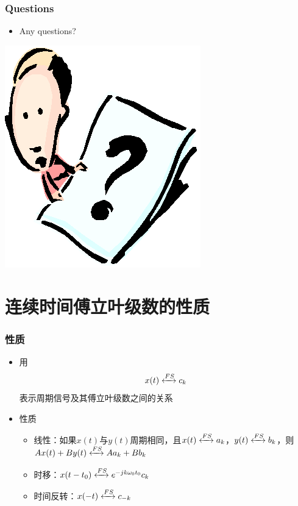 \documentclass[CJKutf8,xcolor=pdftex,dvipsnames,table]{beamer}
\begin{document}
\begin{CJK*}{UTF8}{song}
  \begin{frame}
    \frametitle{Questions}
    \begin{itemize}
    \item Any questions?
    \end{itemize}
    \begin{center}
      \includegraphics[scale=.5]{question}
    \end{center}
  \end{frame}  
  
  \section{连续时间傅立叶级数的性质}  
  
  \begin{frame}
    \frametitle{性质}
    \begin{itemize}
    \item 用
    \[ x(t) \xleftrightarrow{FS} c_k \]
    表示周期信号及其傅立叶级数之间的关系    
    \item 性质
    	\begin{itemize}
    	\item 线性：如果$x(t)$与$y(t)$周期相同，且$x(t) \xleftrightarrow{FS} a_k$，$y(t) \xleftrightarrow{FS} b_k$，则$Ax(t)+By(t) \xleftrightarrow{FS} Aa_k+Bb_k$
    	\item 时移：$x(t-t_0) \xleftrightarrow{FS} e^{-jk\omega_0 t_0} c_k $
		\item 时间反转：$x(-t) \xleftrightarrow{FS} c_{-k} $
    	\end{itemize}
	\end{itemize}
  \end{frame}  
    

\end{CJK*}
\end{document}
